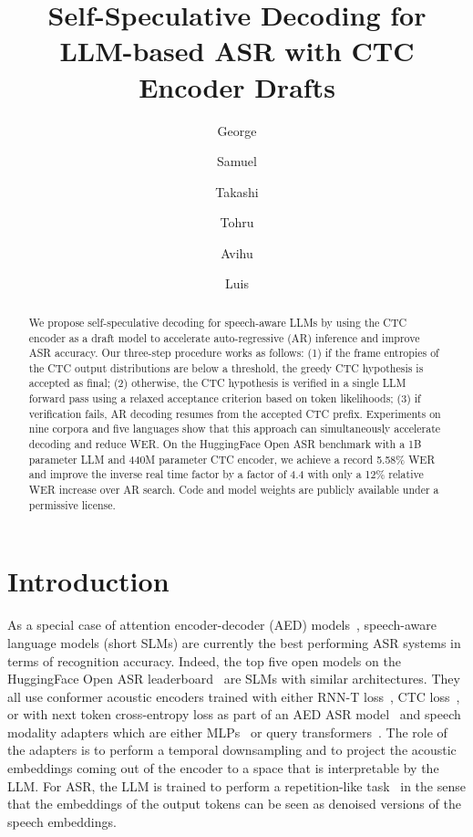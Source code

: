 \documentclass[cameraready]{Interspeech}
\title{Self-Speculative Decoding for LLM-based ASR with CTC Encoder Drafts}
\author{George}{Saon}
\author{Samuel}{Thomas}
\author{Takashi}{Fukuda}
\author{Tohru}{Nagano}
\author{Avihu}{Dekel}
\author{Luis}{Lastras}
\begin{document}
\maketitle

\begin{abstract}
We propose self-speculative decoding for speech-aware LLMs by using the CTC encoder as a draft model to accelerate auto-regressive (AR) inference and improve ASR accuracy. Our three-step procedure works as follows: (1) if the frame entropies of the CTC output distributions are below a threshold, the greedy CTC hypothesis is accepted as final; (2) otherwise, the CTC hypothesis is verified in a single LLM forward pass using a relaxed acceptance criterion based on token likelihoods; (3) if verification fails, AR decoding resumes from the accepted CTC prefix. Experiments on nine corpora and five languages show that this approach can simultaneously accelerate decoding and reduce WER. On the HuggingFace Open ASR benchmark with a 1B parameter LLM and 440M parameter CTC encoder, we achieve a record 5.58\% WER and improve the inverse real time factor by a factor of 4.4 with only a 12\% relative WER increase over AR search. Code and model weights are publicly available under a permissive license.
    
\end{abstract}

\section{Introduction}

As a special case of attention encoder-decoder (AED) models~\cite{chan2016listen}, speech-aware language models (short SLMs) are currently the best performing ASR systems in terms of recognition accuracy. Indeed, the top five open models on the HuggingFace Open ASR leaderboard~\cite{srivastav2025open} are SLMs with similar architectures. They all use conformer acoustic encoders trained with either RNN-T loss~\cite{rekesh2023fast,sekoyan2025canary}, CTC loss~\cite{saon2025granite}, or with next token cross-entropy loss as part of an AED ASR model~\cite{abouelenin2025phi,shi2026qwen3asrtechnicalreport} and speech modality adapters which are either MLPs~\cite{chen2024salm,abouelenin2025phi} or query transformers~\cite{saon2025granite}. The role of the adapters is to perform a temporal downsampling and to project the acoustic embeddings coming out of the encoder to a space that is interpretable by the LLM. For ASR, the LLM is trained to perform a repetition-like task~\cite{grattafiori2024llama} in the sense that the embeddings of the output tokens can be seen as denoised versions of the speech embeddings. 
\end{document}

